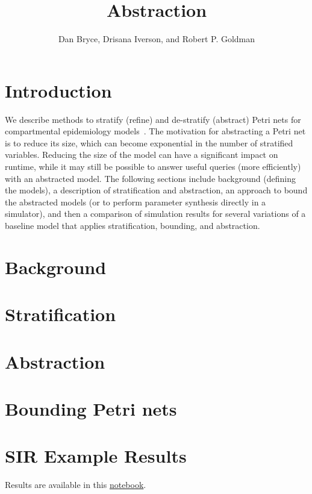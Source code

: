\documentclass[10pt,letterpaper]{article}
\title{\funman Abstraction}
\author{Dan Bryce, Drisana Iverson, and Robert P. Goldman}
\newcommand{\Petrinet}{Petri net\xspace}
\newcommand{\Petrinets}{Petri nets\xspace}
\begin{document}
\maketitle

\section{Introduction}

We describe methods to stratify (refine) and de-stratify (abstract) \Petrinets{} for compartmental epidemiology models~\cite{BrauerSimpleCompartmentalModels2019}.  The motivation for abstracting a \Petrinet{} is to reduce its size, which can become exponential in the number of stratified variables.  Reducing the size of the model can have a significant impact on runtime, while it may still be possible to answer useful queries (more efficiently) with an abstracted model.  The following sections include background (defining the models), a description of stratification and abstraction, an approach to bound the abstracted models (or to perform parameter synthesis directly in a simulator), and then a comparison of simulation results for several variations of a baseline model that applies stratification, bounding, and abstraction.  

\section{Background}


\section{Stratification}


\section{Abstraction}


\section{Bounding \Petrinets{}}


\section{SIR Example Results}
Results are available in this \href{https://github.com/siftech/funman/blob/sep-monthly-demo/notebooks/abstraction-bounding-demo.ipynb}{notebook}.
\end{document}
